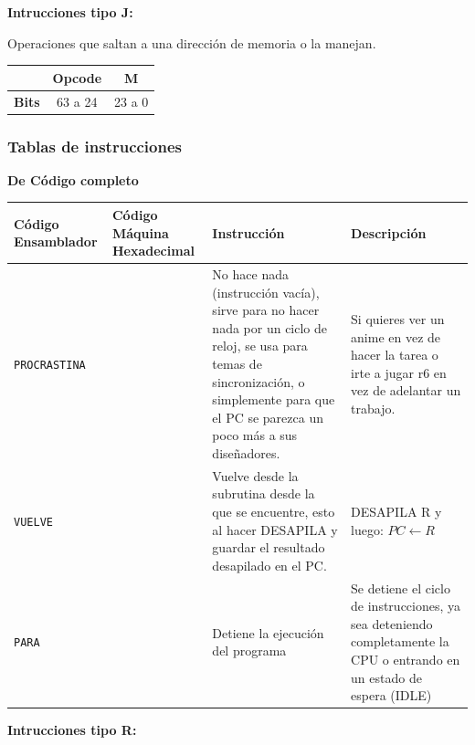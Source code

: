 \documentclass{article}
\begin{document}
\textbf{Intrucciones tipo J:}

Operaciones que saltan a una dirección de memoria o la manejan.

\begin{table}[H]
\centering
\begin{tabular}{|c|c|c|}
\hline
 & \textbf{Opcode} & \textbf{M} \\ \hline
\textbf{Bits} &63 a 24 & 23 a 0 \\
\hline
\end{tabular}
\end{table}

\subsubsection{Tablas de instrucciones}

\textbf{De Código completo}

\begin{longtable}{|p{}|p{}|p{}|p{}|}
  \hline
  \textbf{Código Ensamblador} & \textbf{Código Máquina Hexadecimal} & \textbf{Instrucción}                                               & \textbf{Descripción}                       \\
  \hline
  \texttt{PROCRASTINA}         &     & 
    No hace nada (instrucción vacía), sirve para no hacer nada por un ciclo de reloj, 
        se usa para temas de sincronización, o simplemente para que el PC se parezca un poco más 
        a sus diseñadores. & 
    Si quieres ver un anime en vez de hacer la tarea o irte a jugar r6 en vez de adelantar 
        un trabajo.\\
  \hline
  \texttt{VUELVE} &  & 
    Vuelve desde la subrutina desde la que se encuentre, esto al hacer DESAPILA y guardar 
        el resultado desapilado en el PC. & 
    DESAPILA R y luego: $PC \leftarrow R$                                                                                  \\
  \hline
  \texttt{PARA} &  & Detiene la ejecución del programa & 
    Se detiene el ciclo de instrucciones, ya sea deteniendo completamente la CPU o 
        entrando en un estado de espera (IDLE) \\
  \hline
\end{longtable}


\textbf{Intrucciones tipo R:}
\end{document}

